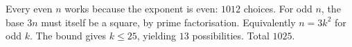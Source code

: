 Every even $n$ works because the exponent is even: $1012$ choices. For odd $n$, the base $3n$ must itself be a square, by prime factorisation. Equivalently $n=3k^2$ for odd $k$. The bound gives $k\le25$, yielding $13$ possibilities. Total $\boxed{1025}$.
